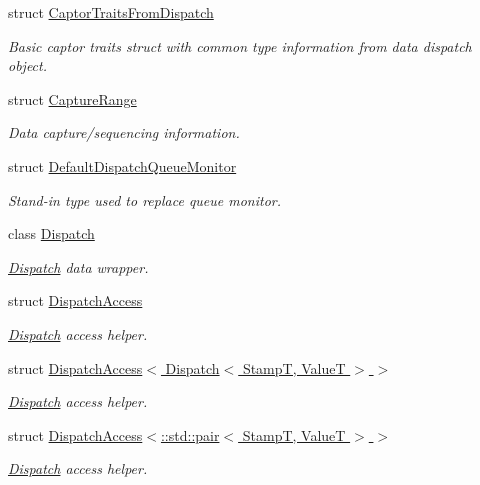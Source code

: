 \begin{DoxyCompactItemize}
struct \hyperlink{structflow_1_1_captor_traits_from_dispatch}{Captor\+Traits\+From\+Dispatch}
\begin{DoxyCompactList}\small\item\em Basic captor traits struct with common type information from data dispatch object. \end{DoxyCompactList}\item 
struct \hyperlink{structflow_1_1_capture_range}{Capture\+Range}
\begin{DoxyCompactList}\small\item\em Data capture/sequencing information. \end{DoxyCompactList}\item 
struct \hyperlink{structflow_1_1_default_dispatch_queue_monitor}{Default\+Dispatch\+Queue\+Monitor}
\begin{DoxyCompactList}\small\item\em Stand-\/in type used to replace queue monitor. \end{DoxyCompactList}\item 
class \hyperlink{classflow_1_1_dispatch}{Dispatch}
\begin{DoxyCompactList}\small\item\em \hyperlink{classflow_1_1_dispatch}{Dispatch} data wrapper. \end{DoxyCompactList}\item 
struct \hyperlink{structflow_1_1_dispatch_access}{Dispatch\+Access}
\begin{DoxyCompactList}\small\item\em \hyperlink{classflow_1_1_dispatch}{Dispatch} access helper. \end{DoxyCompactList}\item 
struct \hyperlink{structflow_1_1_dispatch_access_3_01_dispatch_3_01_stamp_t_00_01_value_t_01_4_01_4}{Dispatch\+Access$<$ Dispatch$<$ Stamp\+T, Value\+T $>$ $>$}
\begin{DoxyCompactList}\small\item\em \hyperlink{classflow_1_1_dispatch}{Dispatch} access helper. \end{DoxyCompactList}\item 
struct \hyperlink{structflow_1_1_dispatch_access_3_1_1std_1_1pair_3_01_stamp_t_00_01_value_t_01_4_01_4}{Dispatch\+Access$<$\+::std\+::pair$<$ Stamp\+T, Value\+T $>$ $>$}
\begin{DoxyCompactList}\small\item\em \hyperlink{classflow_1_1_dispatch}{Dispatch} access helper. \end{DoxyCompactList}\item 

\end{DoxyCompactItemize}
